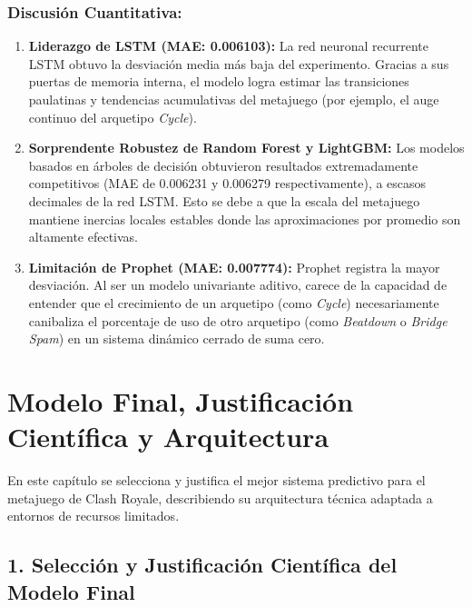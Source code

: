 \documentclass[
  spanish,
  12pt,
]{report}
\providecommand{\tightlist}{%
  \setlength{\itemsep}{0pt}\setlength{\parskip}{0pt}}
\begin{document}
\subsection{Discusión Cuantitativa:}\label{discusiuxf3n-cuantitativa}

\begin{enumerate}
\def\labelenumi{\arabic{enumi}.}
\tightlist
\item
  \textbf{Liderazgo de LSTM (MAE: 0.006103):} La red neuronal recurrente
  LSTM obtuvo la desviación media más baja del experimento. Gracias a
  sus puertas de memoria interna, el modelo logra estimar las
  transiciones paulatinas y tendencias acumulativas del metajuego (por
  ejemplo, el auge continuo del arquetipo \emph{Cycle}).
\item
  \textbf{Sorprendente Robustez de Random Forest y LightGBM:} Los
  modelos basados en árboles de decisión obtuvieron resultados
  extremadamente competitivos (MAE de 0.006231 y 0.006279
  respectivamente), a escasos decimales de la red LSTM. Esto se debe a
  que la escala del metajuego mantiene inercias locales estables donde
  las aproximaciones por promedio son altamente efectivas.
\item
  \textbf{Limitación de Prophet (MAE: 0.007774):} Prophet registra la
  mayor desviación. Al ser un modelo univariante aditivo, carece de la
  capacidad de entender que el crecimiento de un arquetipo (como
  \emph{Cycle}) necesariamente canibaliza el porcentaje de uso de otro
  arquetipo (como \emph{Beatdown} o \emph{Bridge Spam}) en un sistema
  dinámico cerrado de suma cero.
\end{enumerate}

\chapter{Modelo Final, Justificación Científica y
Arquitectura}\label{modelo-final-justificaciuxf3n-cientuxedfica-y-arquitectura}

En este capítulo se selecciona y justifica el mejor sistema predictivo
para el metajuego de Clash Royale, describiendo su arquitectura técnica
adaptada a entornos de recursos limitados.

\section{1. Selección y Justificación Científica del Modelo
Final}\label{selecciuxf3n-y-justificaciuxf3n-cientuxedfica-del-modelo-final}
\end{document}
